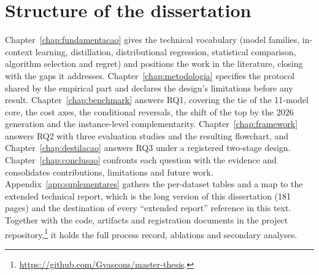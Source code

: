 \section{Structure of the dissertation}
\label{sec:intro-estrutura}

Chapter~\ref{chap:fundamentacao} gives the technical vocabulary
(model families, in-context learning, distillation, distributional
regression, statistical comparison, algorithm selection and regret)
and positions the work in the literature, closing with the gaps it
addresses. Chapter~\ref{chap:metodologia} specifies the protocol
shared by the empirical part and declares the design's limitations
before any result. Chapter~\ref{chap:benchmark} answers RQ1, covering
the tie of the 11-model core, the cost axes, the
conditional reversals, the shift of the top by the 2026 generation
and the instance-level complementarity.
Chapter~\ref{chap:framework} answers RQ2 with three evaluation
studies and the resulting flowchart, and Chapter~\ref{chap:destilacao}
answers RQ3 under a registered two-stage design.
Chapter~\ref{chap:conclusao} confronts each question with the
evidence and consolidates contributions, limitations and future
work. Appendix~\ref{app:suplementares} gathers the per-dataset tables
and a map to the extended technical report, which is the long version of
this dissertation (181 pages) and the destination of every
``extended report'' reference in this text. Together with the
code, artifacts and registration documents in the project
repository,\footnote{\url{https://github.com/Gvascons/master-thesis}.}
it holds the full process record, ablations and secondary analyses.
